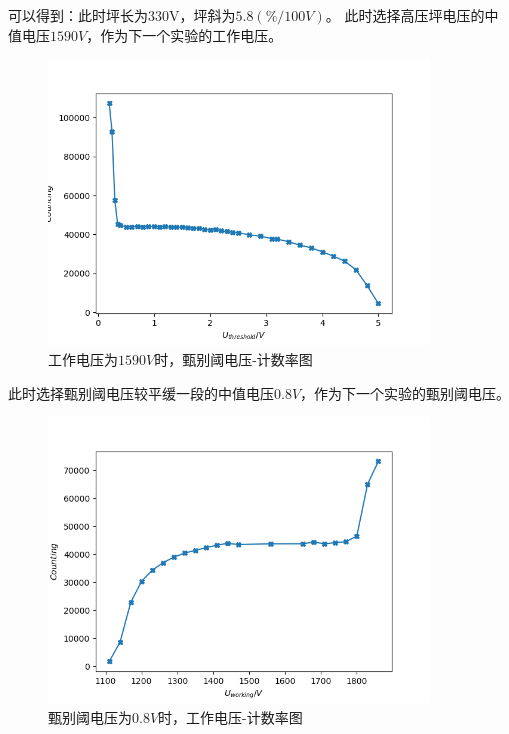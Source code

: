 \documentclass[a4paper,UTF8]{ctexart}
\begin{document}
可以得到：此时坪长为330V，坪斜为$5.8(\%/100V)$。
此时选择高压坪电压的中值电压$1590V$，作为下一个实验的工作电压。

\begin{figure}[H]
    \centering
    \begin{minipage}[b]{0.9\textwidth}
        \centering
        \includegraphics[width=0.9\textwidth]{./ffig2.png}
        \caption{工作电压为$1590V$时，甄别阈电压-计数率图}
    \end{minipage}
\end{figure}

此时选择甄别阈电压较平缓一段的中值电压$0.8V$，作为下一个实验的甄别阈电压。

\begin{figure}[H]
    \centering
    \begin{minipage}[b]{0.9\textwidth}
        \centering
        \includegraphics[width=0.9\textwidth]{./ffig3.png}
        \caption{甄别阈电压为$0.8V$时，工作电压-计数率图}
    \end{minipage}
\end{figure}
\end{document}
